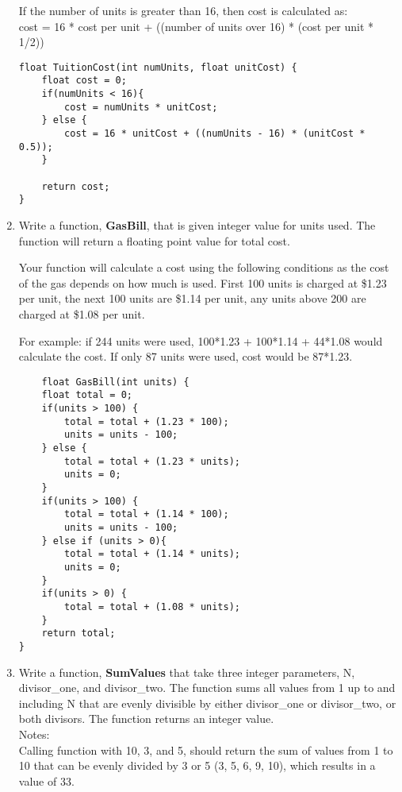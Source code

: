 \documentclass{article}
\begin{document}
\begin{enumerate}
If the number of units is greater than 16, then cost is calculated as:\\
                 cost = 16 * cost per unit + ((number of units over 16) * (cost per unit * 1/2))

\begin{lstlisting}
float TuitionCost(int numUnits, float unitCost) {
    float cost = 0;
    if(numUnits < 16){
        cost = numUnits * unitCost;
    } else {
        cost = 16 * unitCost + ((numUnits - 16) * (unitCost * 0.5));
    }
    
    return cost;
}
\end{lstlisting}


	\item Write a function, \textbf{GasBill}, that is given integer value for units used. The function will return a floating point value for total cost.  

Your function will calculate a cost using the following conditions as the cost of the gas depends on how much is used. 
       First 100 units is charged at \$1.23 per unit, 
       the next 100 units are \$1.14 per unit, 
       any units above 200 are charged at \$1.08 per unit. 

For example: if 244 units were used, 100*1.23 + 100*1.14 + 44*1.08 would calculate the cost. If only 87 units were used, cost would be 87*1.23.

\begin{lstlisting}
	float GasBill(int units) {
    float total = 0;
    if(units > 100) {
        total = total + (1.23 * 100);
        units = units - 100;
    } else {
        total = total + (1.23 * units);
        units = 0;
    }
    if(units > 100) {
        total = total + (1.14 * 100);
        units = units - 100;
    } else if (units > 0){
        total = total + (1.14 * units);
        units = 0;
    }
    if(units > 0) {
        total = total + (1.08 * units);
    }
    return total;
}
\end{lstlisting}



	\item Write a function, \textbf{SumValues} that take three integer parameters, N, divisor\_one, and divisor\_two.  The function sums all values from 1 up to and including N that are evenly divisible by either divisor\_one or divisor\_two, or both divisors.  The function returns an integer value.\\
Notes: \\
Calling function with 10, 3, and 5, should return the sum of values from 1 to 10 that can be evenly divided by 3 or 5 (3, 5, 6, 9, 10), which results in a value of 33.


\end{enumerate}
\end{document}
